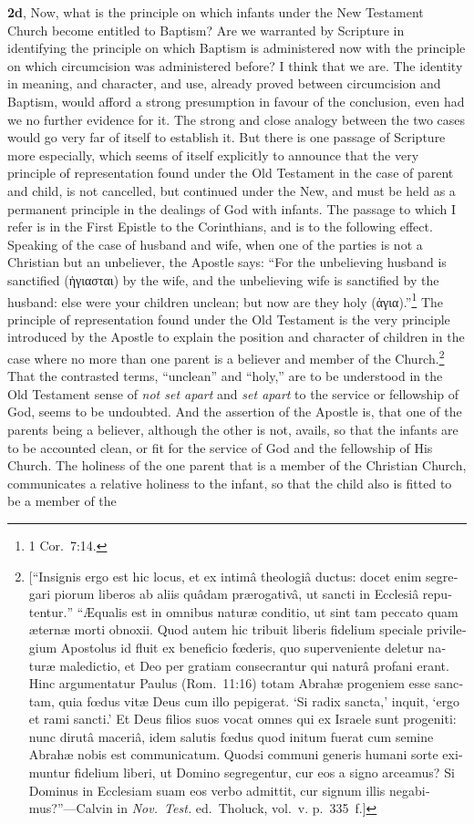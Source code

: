 \documentclass[
  english,
]{book}
\providecommand{\textlatin}{}
\renewcommand{\textlatin}[2][]{\foreignlanguage{latin}{#2}}
\newcommand{\textgreek}[2][]{\foreignlanguage{greek}{#2}}
\begin{document}
\textbf{2d}, Now, what is the principle on which infants under the New Testament Church become entitled to Baptism? Are we warranted by Scripture in identifying the principle on which Baptism is administered now with the principle on which circumcision was administered before? I think that we are. The identity in meaning, and character, and use, already proved between circumcision and Baptism, would afford a strong presumption in favour of the conclusion, even had we no further evidence for it. The strong and close analogy between the two cases would go very far of itself to establish it. But there is one passage of Scripture more especially, which seems of itself explicitly to announce that the very principle of representation found under the Old Testament in the case of parent and child, is not cancelled, but continued under the New, and must be held as a permanent principle in the dealings of God with infants. The passage to which I refer is in the First Epistle to the Corinthians, and is to the following effect. Speaking of the case of husband and wife, when one of the parties is not a Christian but an unbeliever, the Apostle says: ``For the unbelieving husband is sanctified (\textgreek{ἡγιασται}) by the wife, and the unbelieving wife is sanctified by the husband: else were your children unclean; but now are they holy (\textgreek{ἁγια}).''\footnote{1 Cor.~7:14.} The principle of representation found under the Old Testament is the very principle introduced by the Apostle to explain the position and character of children in the case where no more than one parent is a believer and member of the Church.\footnote{{[}``\textlatin{Insignis ergo est hic locus, et ex intimâ theologiâ ductus: docet enim segregari piorum liberos ab aliis quâdam prærogativâ, ut sancti in Ecclesiâ reputentur.}'' ``\textlatin{Æqualis est in omnibus naturæ conditio, ut sint tam peccato quam æternæ morti obnoxii. Quod autem hic tribuit liberis fidelium speciale privilegium Apostolus id fluit ex beneficio fœderis, quo superveniente deletur naturæ maledictio, et Deo per gratiam consecrantur qui naturâ profani erant. Hinc argumentatur Paulus} (Rom.~11:16) \textlatin{totam Abrahæ progeniem esse sanctam, quia fœdus vitæ Deus cum illo pepigerat. `Si radix sancta,' inquit, `ergo et rami sancti.' Et Deus filios suos vocat omnes qui ex Israele sunt progeniti: nunc dirutâ maceriâ, idem salutis fœdus quod initum fuerat cum semine Abrahæ nobis est communicatum. Quodsi communi generis humani sorte eximuntur fidelium liberi, ut Domino segregentur, cur eos a signo arceamus? Si Dominus in Ecclesiam suam eos verbo admittit, cur signum illis negabimus?}''---Calvin in \emph{Nov.~Test.} ed.~Tholuck, vol.~v. p.~335~f.{]}} That the contrasted terms, ``unclean'' and ``holy,'' are to be understood in the Old Testament sense of \emph{not set apart} and \emph{set apart} to the service or fellowship of God, seems to be undoubted. And the assertion of the Apostle is, that one of the parents being a believer, although the other is not, avails, so that the infants are to be accounted clean, or fit for the service of God and the fellowship of His Church. The holiness of the one parent that is a member of the Christian Church, communicates a relative holiness to the infant, so that the child also is fitted to be a member of the 
\end{document}
